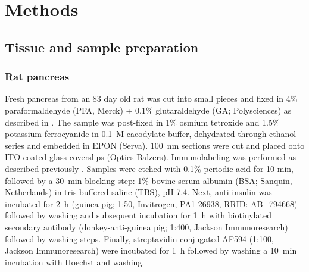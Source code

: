 \section{Methods}
\label{sec:4.4_methods}


\subsection{Tissue and sample preparation}
\label{sec:4methods_prep}

\subsubsection{Rat pancreas}
\label{sec:4methods_prep_rp}
Fresh pancreas from an 83 day old rat was cut into small pieces and fixed in 4\% paraformaldehyde (PFA, Merck) + 0.1\% glutaraldehyde (GA; Polysciences) as described in \textcite{ravelli2013destruction}. The sample was post-fixed in 1\% osmium tetroxide and 1.5\% potassium ferrocyanide in \SI{0.1}{M} cacodylate buffer, dehydrated through ethanol series and embedded in EPON (Serva). \SI{100}{\nano\meter} sections were cut and placed onto ITO-coated glass coverslips (Optics Balzers). Immunolabeling was performed as described previously \cite{kuipers2015scanning}. Samples were etched with 0.1\% periodic acid for 10 min, followed by a \SI{30}{\minute} blocking step: 1\% bovine serum albumin (BSA; Sanquin, Netherlands) in tris-buffered saline (TBS), pH 7.4. Next, anti-insulin was incubated for \SI{2}{\hour} (guinea pig; 1:50, Invitrogen, PA1-26938, RRID: AB\_794668) followed by washing and subsequent incubation for \SI{1}{\hour} with biotinylated secondary antibody (donkey-anti-guinea pig; 1:400, Jackson Immunoresearch) followed by washing steps. Finally, streptavidin conjugated AF594 (1:100, Jackson Immunoresearch) were incubated for \SI{1}{\hour} followed by washing a \SI{10}{\minute} incubation with Hoechst and washing.

